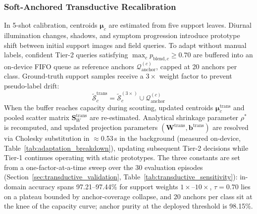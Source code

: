 \documentclass[preprint,12pt]{elsarticle}
\begin{document}
\subsubsection{Soft-Anchored Transductive Recalibration}
\label{sec:transductive}
In 5-shot calibration, centroids $\boldsymbol{\mu}_c$ are estimated from five support leaves. Diurnal illumination changes, shadows, and symptom progression introduce prototype shift between initial support images and field queries. To adapt without manual labels, confident Tier-2 queries satisfying $\max_c p_{\text{blend}, c} \ge 0.70$ are buffered into an on-device FIFO queue as reference anchors $\mathcal{Q}_{\text{anchor}}^{(c)}$, capped at 20 anchors per class. Ground-truth support samples receive a $3\times$ weight factor to prevent pseudo-label drift:
\begin{equation}
    \tilde{\mathcal{S}}_c^{\text{trans}} = \tilde{\mathcal{S}}_c^{(3\times)} \cup \mathcal{Q}_{\text{anchor}}^{(c)}
\end{equation}
When the buffer reaches capacity during scouting, updated centroids $\boldsymbol{\mu}_c^{\text{trans}}$ and pooled scatter matrix $\mathbf{S}_W^{\text{trans}}$ are re-estimated. Analytical shrinkage parameter $\rho^*$ is recomputed, and updated projection parameters $(\mathbf{W}^{\text{trans}}, \mathbf{b}^{\text{trans}})$ are resolved via Cholesky substitution in $\approx$0.53\,s in the background (measured on-device, Table~\ref{tab:adaptation_breakdown}), updating subsequent Tier-2 decisions while Tier-1 continues operating with static prototypes. The three constants are set from a one-factor-at-a-time sweep over the 30 evaluation episodes (Section~\ref{sec:transductive_validation}, Table~\ref{tab:transductive_sensitivity}): in-domain accuracy spans 97.21--97.44\% for support weights $1\times$--$10\times$, $\tau = 0.70$ lies on a plateau bounded by anchor-coverage collapse, and 20 anchors per class sit at the knee of the capacity curve; anchor purity at the deployed threshold is 98.15\%.
\end{document}
